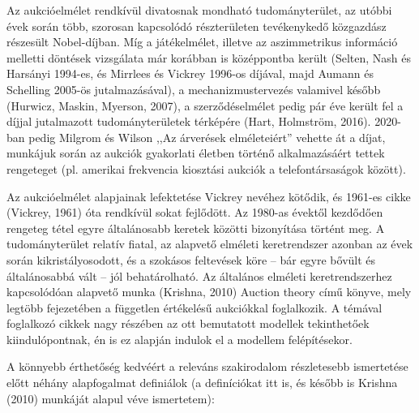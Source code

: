 \documentclass[twoside, magyar, showtrims]{corvinusphd}
\theoremstyle{plain}
\theoremstyle{remark}
\theoremstyle{definition}
\begin{document}
\scwords Az aukcióelmélet rendkívül divatosnak mondható tudományterület,
az utóbbi évek során több, szorosan kapcsolódó részterületen tevékenykedő
közgazdász részesült Nobel-díjban. Míg a játékelmélet, illetve az aszimmetrikus
információ melletti döntések vizsgálata már korábban is középpontba került
(Selten, Nash és Harsányi 1994-es, és Mirrlees és Vickrey 1996-os díjával,
majd Aumann és Schelling 2005-ös jutalmazásával), a mechanizmustervezés
valamivel később (Hurwicz, Maskin, Myerson, 2007), a szerződéselmélet
pedig pár éve került fel a díjjal jutalmazott tudományterületek térképére
(Hart, Holmström, 2016). 2020-ban pedig Milgrom és Wilson 
,,Az árverések elméleteiért'' vehette át a díjat, munkájuk során
az aukciók gyakorlati életben történő alkalmazásáért tettek rengeteget
(pl. amerikai frekvencia kiosztási aukciók a telefontársaságok között).

Az aukcióelmélet alapjainak lefektetése Vickrey nevéhez kötődik,
és 1961-es cikke (Vickrey, 1961) óta rendkívül sokat fejlődött.
Az 1980-as évektől kezdődően rengeteg tétel egyre általánosabb
keretek közötti bizonyítása történt meg. A tudományterület
relatív fiatal, az alapvető elméleti keretrendszer azonban az
évek során kikristályosodott, és a szokásos feltevések köre –
bár egyre bővült és általánosabbá vált – jól behatárolható.
Az általános elméleti keretrendszerhez kapcsolódóan alapvető
munka (Krishna, 2010) Auction theory című könyve,
mely legtöbb fejezetében a független értékelésű aukciókkal foglalkozik.
A témával foglalkozó cikkek nagy részében az ott bemutatott
modellek tekinthetőek kiindulópontnak, én is ez alapján indulok
el a modellem felépítésekor.

A könnyebb érthetőség kedvéért a releváns szakirodalom
részletesebb ismertetése előtt néhány alapfogalmat definiálok
(a definíciókat itt is, és később is Krishna (2010) munkáját alapul véve ismertetem):
\end{document}
